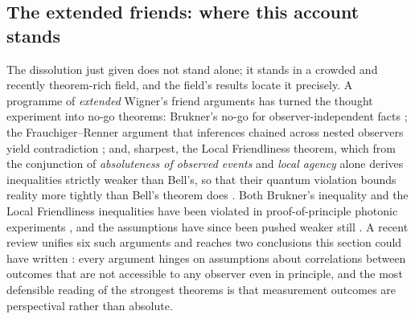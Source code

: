 \subsection{The extended friends: where this account stands}
\label{sec:wf-ewf}

The dissolution just given does not stand alone; it stands in a crowded and
recently theorem-rich field, and the field's results locate it precisely. A
programme of \emph{extended} Wigner's friend arguments has turned the thought
experiment into no-go theorems: Brukner's no-go for observer-independent facts
\autocite{brukner2018nogo}; the Frauchiger--Renner argument that inferences
chained across nested observers yield contradiction \autocite{Frauchiger_2018};
and, sharpest, the Local Friendliness theorem, which from the conjunction of
\emph{absoluteness of observed events} and \emph{local agency} alone derives
inequalities strictly weaker than Bell's, so that their quantum violation bounds
reality more tightly than Bell's theorem does
\autocite{bong2020strong,cavalcantiwiseman2021implications}. Both Brukner's
inequality and the Local Friendliness inequalities have been violated in
proof-of-principle photonic experiments
\autocite{proietti2019experimental,bong2020strong}, and the assumptions have
since been pushed weaker still
\autocite{haddaracavalcanti2023possibilistic,morenoetal2022maximally}. A recent
review unifies six such arguments and reaches two conclusions this section could
have written \autocite{schmidyingleifer2023sixewf}: every argument hinges on
assumptions about correlations between outcomes that are not accessible to any
observer even in principle, and the most defensible reading of the strongest
theorems is that measurement outcomes are perspectival rather than absolute.

